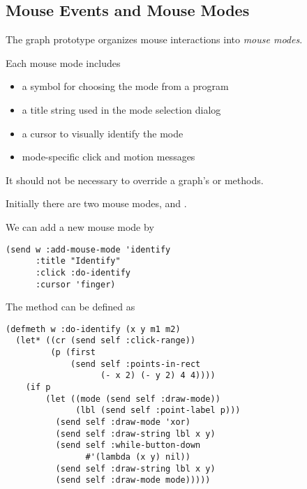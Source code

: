 \begin{slide}{}
\subsection{Mouse Events and Mouse Modes}
The graph prototype organizes mouse interactions into {\em mouse modes}.

Each mouse mode includes
\begin{itemize}
\item a symbol for choosing the mode from a program
\item a title string used in the mode selection dialog
\item a cursor to visually identify the mode
\item mode-specific click and motion messages
\end{itemize}
It should not be necessary to override a graph's  or
 methods.
\end{slide}

\begin{slide}{}
Initially there are two mouse modes,  and
.

We can add a new mouse mode by
{\Large
\begin{verbatim}
(send w :add-mouse-mode 'identify
      :title "Identify"
      :click :do-identify
      :cursor 'finger)
\end{verbatim}}
The  method can be defined as
{\Large
\begin{verbatim}
(defmeth w :do-identify (x y m1 m2)
  (let* ((cr (send self :click-range))
         (p (first
             (send self :points-in-rect 
                   (- x 2) (- y 2) 4 4))))
    (if p
        (let ((mode (send self :draw-mode))
              (lbl (send self :point-label p)))
          (send self :draw-mode 'xor)
          (send self :draw-string lbl x y)
          (send self :while-button-down
                #'(lambda (x y) nil))
          (send self :draw-string lbl x y)
          (send self :draw-mode mode)))))
\end{verbatim}}
\end{slide}

